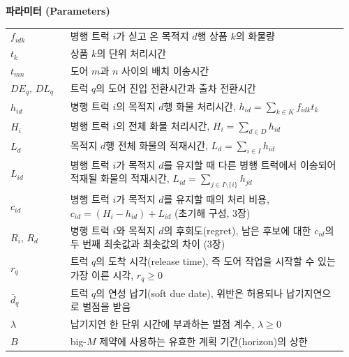 \documentclass[10pt,a4paper]{article}
\begin{document}
\begin{table}[H]
{\begin{minipage}{0.94\columnwidth}
\medskip
\noindent\textbf{파라미터 (Parameters)}\\[1mm]
\begin{tabular}{@{}p{0.17\linewidth}p{0.79\linewidth}@{}}
$f_{idk}$ & 병행 트럭 $i$가 싣고 온 목적지 $d$행 상품 $k$의 화물량 \\
$t_k$ & 상품 $k$의 단위 처리시간 \\
$t_{mn}$ & 도어 $m$과 $n$ 사이의 배치 이송시간 \\
$DE_q$, $DL_q$ & 트럭 $q$의 도어 진입 전환시간과 출차 전환시간 \\
$h_{id}$ & 병행 트럭 $i$의 목적지 $d$행 화물 처리시간, $h_{id}=\sum_{k\in K}f_{idk}t_k$ \\
$H_i$ & 병행 트럭 $i$의 전체 화물 처리시간, $H_i=\sum_{d\in D}h_{id}$ \\
$L_d$ & 목적지 $d$행 전체 화물의 적재시간, $L_d=\sum_{i\in I}h_{id}$ \\
$L_{id}$ & 병행 트럭 $i$가 목적지 $d$를 유지할 때 다른 병행 트럭에서 이송되어 적재될 화물의 적재시간, $L_{id}=\sum_{j\in I\setminus\{i\}}h_{jd}$ \\
$c_{id}$ & 병행 트럭 $i$가 목적지 $d$를 유지할 때의 처리 비용, $c_{id}=(H_i-h_{id})+L_{id}$ (초기해 구성, 3장) \\
$R_i$, $R_d$ & 병행 트럭 $i$와 목적지 $d$의 후회도(regret), 남은 후보에 대한 $c_{id}$의 두 번째 최솟값과 최솟값의 차이 (3장) \\
$r_q$ & 트럭 $q$의 도착 시각(release time), 즉 도어 작업을 시작할 수 있는 가장 이른 시각, $r_q\ge0$ \\
$\bar d_q$ & 트럭 $q$의 연성 납기(soft due date), 위반은 허용되나 납기지연으로 벌점을 받음 \\
$\lambda$ & 납기지연 한 단위 시간에 부과하는 벌점 계수, $\lambda\ge0$ \\
$B$ & big-$M$ 제약에 사용하는 유효한 계획 기간(horizon)의 상한 \\
\end{tabular}


\end{minipage}}
\end{table}
\end{document}
